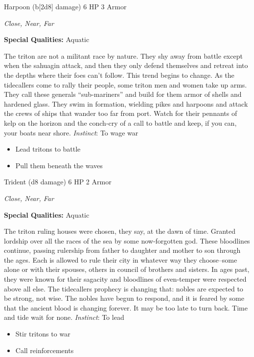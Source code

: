 Harpoon (b[2d8] damage)\hspace*{\fill} 6 HP 3 Armor

\emph{Close, Near, Far}

\textbf{Special Qualities:}
Aquatic

\HRule
The triton are not a militant race by nature. They shy away from battle except when the sahuagin attack, and then they only defend themselves and retreat into the depths where their foes can't follow. This trend begins to change. As the tidecallers come to rally their people, some triton men and women take up arms. They call these generals ``sub-mariners'' and build for them armor of shells and hardened glass. They swim in formation, wielding pikes and harpoons and attack the crews of ships that wander too far from port. Watch for their pennants of kelp on the horizon and the conch-cry of a call to battle and keep, if you can, your boats near shore. \emph{Instinct}: To wage war
\begin{itemize}
\item Lead tritons to battle
\item Pull them beneath the waves
\end{itemize}
\newpage
\HRule
{}

Trident (d8 damage)\hspace*{\fill} 6 HP 2 Armor

\emph{Close, Near, Far}

\textbf{Special Qualities:}
Aquatic

\HRule
The triton ruling houses were chosen, they say, at the dawn of time. Granted lordship over all the races of the sea by some now-forgotten god. These bloodlines continue, passing rulership from father to daughter and mother to son through the ages. Each is allowed to rule their city in whatever way they choose--some alone or with their spouses, others in council of brothers and sisters. In ages past, they were known for their sagacity and bloodlines of even-temper were respected above all else. The tidecallers prophecy is changing that: nobles are expected to be strong, not wise. The nobles have begun to respond, and it is feared by some that the ancient blood is changing forever. It may be too late to turn back. Time and tide wait for none. \emph{Instinct}: To lead
\begin{itemize}
\item Stir tritons to war
\item Call reinforcements
\end{itemize}
